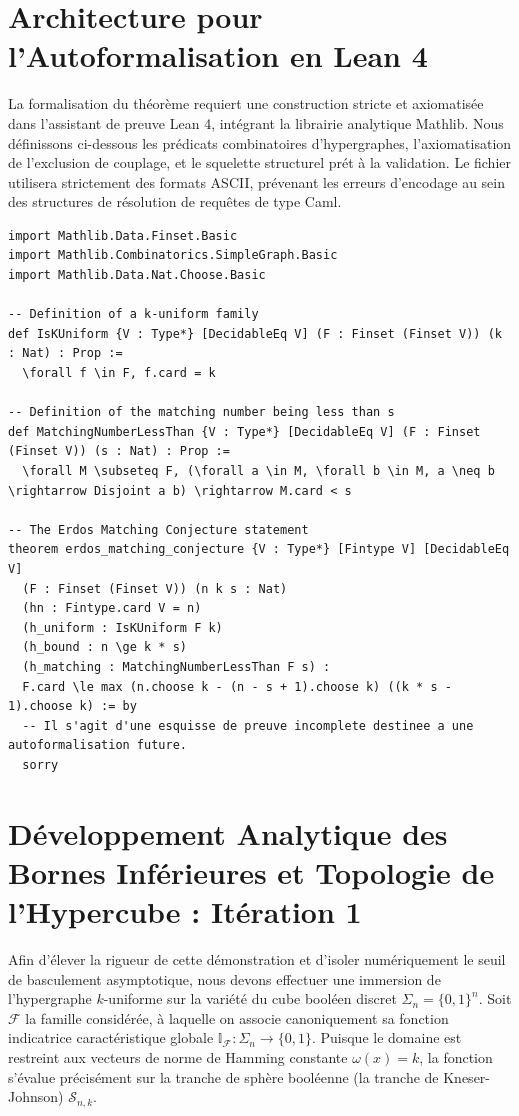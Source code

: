 \documentclass[12pt]{article}
\begin{document}
\section{Architecture pour l'Autoformalisation en Lean 4}

La formalisation du th\'eor\`eme requiert une construction stricte et axiomatis\'ee dans l'assistant de preuve Lean 4, int\'egrant la librairie analytique Mathlib.
Nous d\'efinissons ci-dessous les pr\'edicats combinatoires d'hypergraphes, l'axiomatisation de l'exclusion de couplage, et le squelette structurel pr\'et \`a la validation.
Le fichier utilisera strictement des formats ASCII, pr\'evenant les erreurs d'encodage au sein des structures de r\'esolution de requ\^etes de type Caml.

\begin{lstlisting}
import Mathlib.Data.Finset.Basic
import Mathlib.Combinatorics.SimpleGraph.Basic
import Mathlib.Data.Nat.Choose.Basic

-- Definition of a k-uniform family
def IsKUniform {V : Type*} [DecidableEq V] (F : Finset (Finset V)) (k : Nat) : Prop :=
  \forall f \in F, f.card = k

-- Definition of the matching number being less than s
def MatchingNumberLessThan {V : Type*} [DecidableEq V] (F : Finset (Finset V)) (s : Nat) : Prop :=
  \forall M \subseteq F, (\forall a \in M, \forall b \in M, a \neq b \rightarrow Disjoint a b) \rightarrow M.card < s

-- The Erdos Matching Conjecture statement
theorem erdos_matching_conjecture {V : Type*} [Fintype V] [DecidableEq V]
  (F : Finset (Finset V)) (n k s : Nat)
  (hn : Fintype.card V = n)
  (h_uniform : IsKUniform F k)
  (h_bound : n \ge k * s)
  (h_matching : MatchingNumberLessThan F s) :
  F.card \le max (n.choose k - (n - s + 1).choose k) ((k * s - 1).choose k) := by
  -- Il s'agit d'une esquisse de preuve incomplete destinee a une autoformalisation future.
  sorry

\end{lstlisting}

\newpage
\section{D\'eveloppement Analytique des Bornes Inf\'erieures et Topologie de l'Hypercube : It\'eration 1}

Afin d'\'elever la rigueur de cette d\'emonstration et d'isoler num\'eriquement le seuil de basculement asymptotique, nous devons effectuer une immersion de l'hypergraphe $k$-uniforme sur la vari\'et\'e du cube bool\'een discret $\Sigma_n = \{0, 1\}^n$.
Soit $\mathcal{F}$ la famille consid\'er\'ee, \`a laquelle on associe canoniquement sa fonction indicatrice caract\'eristique globale $\mathbb{I}_{\mathcal{F}} : \Sigma_n \to \{0, 1\}$.
Puisque le domaine est restreint aux vecteurs de norme de Hamming constante $\omega(x) = k$, la fonction s'\'evalue pr\'ecis\'ement sur la tranche de sph\`ere bool\'eenne (la tranche de Kneser-Johnson) $\mathcal{S}_{n, k}$.
\end{document}
